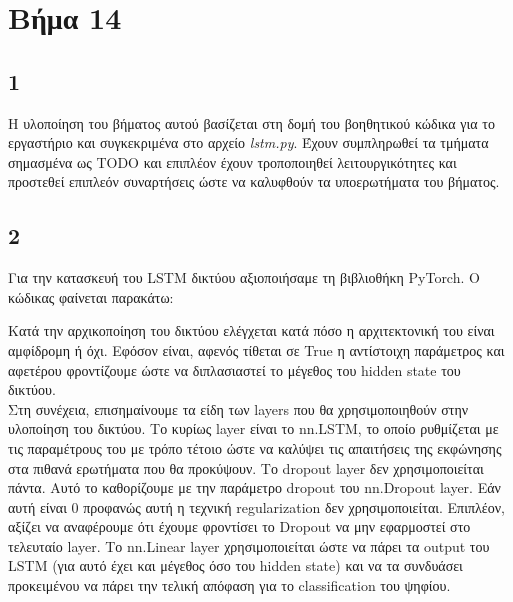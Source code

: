 \section*{Βήμα 14}
\subsection*{1}
Η υλοποίηση του βήματος αυτού βασίζεται στη δομή του βοηθητικού κώδικα για το εργαστήριο και συγκεκριμένα στο αρχείο \textit{lstm.py}. Έχουν συμπληρωθεί τα τμήματα σημασμένα ως TODO και επιπλέον έχουν τροποποιηθεί λειτουργικότητες και προστεθεί επιπλεόν συναρτήσεις ώστε να καλυφθούν τα υποερωτήματα του βήματος.

\subsection*{2}
Για την κατασκευή του LSTM δικτύου αξιοποιήσαμε τη βιβλιοθήκη PyTorch. Ο κώδικας φαίνεται παρακάτω:



\noindent Κατά την αρχικοποίηση του δικτύου ελέγχεται κατά πόσο η αρχιτεκτονική του είναι αμφίδρομη ή όχι. Εφόσον είναι, αφενός τίθεται σε True η αντίστοιχη παράμετρος και αφετέρου φροντίζουμε ώστε να διπλασιαστεί το μέγεθος του hidden state του δικτύου. \\

\noindent Στη συνέχεια, επισημαίνουμε τα είδη των layers που θα χρησιμοποιηθούν στην υλοποίηση του δικτύου. Το κυρίως layer είναι το nn.LSTM, το οποίο ρυθμίζεται με τις παραμέτρους του με τρόπο τέτοιο ώστε να καλύψει τις απαιτήσεις της εκφώνησης στα πιθανά ερωτήματα που θα προκύψουν.
\noindent Το dropout layer δεν χρησιμοποιείται πάντα. Αυτό το καθορίζουμε με την παράμετρο dropout του nn.Dropout layer. Εάν αυτή είναι 0 προφανώς αυτή η τεχνική regularization δεν χρησιμοποιείται. Επιπλέον, αξίζει να αναφέρουμε ότι έχουμε φροντίσει το Dropout να μην εφαρμοστεί στο τελευταίο layer.
\noindent Το nn.Linear layer χρησιμοποιείται ώστε να πάρει τα output του LSTM (για αυτό έχει και μέγεθος όσο του hidden state) και να τα συνδυάσει προκειμένου να πάρει την τελική απόφαση για το classification του ψηφίου. \\

